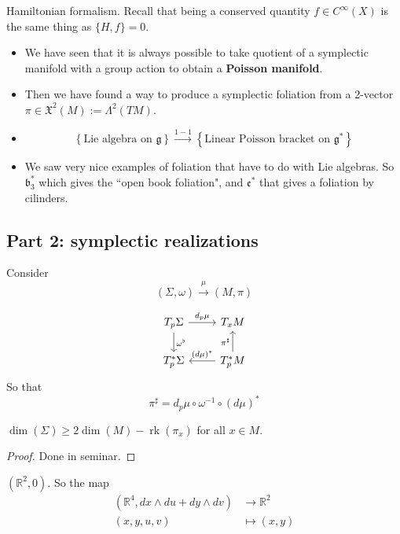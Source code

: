 Hamiltonian formalism. Recall that being a conserved quantity \(f \in C^\infty(X)\) is the same thing as \(\{H,f\}=0\).

\begin{itemize}
\item We have seen that it is always possible to take quotient of a symplectic manifold with a group action to obtain a \textbf{Poisson manifold}.
\item Then we have found a way to produce a symplectic foliation from a 2-vector \(\pi \in \mathfrak{X}^2(M):=\Lambda^{2}(TM)\).
\item
	\begin{remark}\leavevmode
	\[\left\{ \text{Lie algebra on \(\mathfrak{g}\)} \right\} \xrightarrow{1-1}\left\{ \text{Linear Poisson bracket on \(\mathfrak{g}^*\)}  \right\}  \]
	\end{remark}
\item We saw very nice examples of foliation that have to do with Lie algebras. So \(\mathfrak{b}^*_3\) which gives the ``open book foliation", and \(\mathfrak{e}^*\) that gives a foliation by cilinders.
\end{itemize}

\subsection{Part 2: symplectic realizations}

Consider
\[(\Sigma,\omega) \xrightarrow{\mu}(M,\pi)\]

\[\begin{tikzcd}
	T_p\Sigma \arrow[r,"d_p\mu"]\arrow[d,"\omega^\flat"]&T_xM\\
	T_p^*\Sigma &  T^*_pM\arrow[l,"(d\mu)^*",swap]\arrow[u,"\pi ^\sharp"]
\end{tikzcd}\]
So that 
\[\pi ^\sharp=d_p\mu \circ \omega^{-1} \circ(d\mu)^*\]



\begin{lemma}\leavevmode
\(\dim (\Sigma) \geq  2 \dim (M) - \operatorname{rk}(\pi_x)\) for all \(x \in M\).
\end{lemma}

\begin{proof}\leavevmode
Done in seminar.
\end{proof}

\begin{example}\leavevmode
\((\mathbb{R}^2,0)\). So the map
\begin{align*}
	(\mathbb{R}^4,dx \wedge du + dy \wedge dv) &\longrightarrow  \mathbb{R}^2\\
	(x,y,u,v) &\longmapsto (x,y)
\end{align*}

\end{example}

